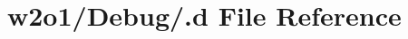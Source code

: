 \hypertarget{w2o1_2_debug_2_8d}{}\section{w2o1/\+Debug/.d File Reference}
\label{w2o1_2_debug_2_8d}
